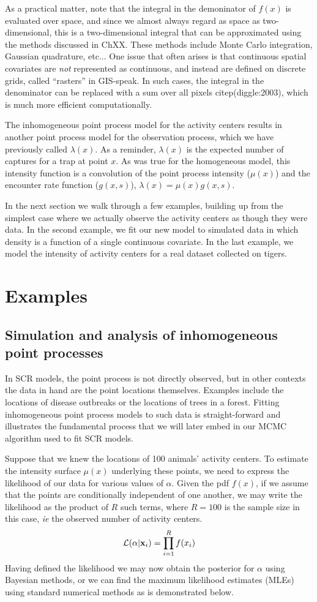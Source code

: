 \documentclass{book}
\begin{document}
As a practical matter, note that the integral in the
demoninator of $f(x)$ is evaluated over space, and since we almost always regard as
space as two-dimensional, this is a two-dimensional integral that can
be approximated using the methods discussed in ChXX. These methods include
Monte Carlo integration, Gaussian quadrature, etc... One
issue that often arises is that continuous spatial covariates are
\emph{not} represented as continuous, and instead are
defined on discrete grids, called ``rasters'' in GIS-speak. In such
cases, the integral in the denominator can be replaced with a sum over
all pixels citep(diggle:2003), which is much more efficient
computationally.

The inhomogeneous point process model for the activity centers results
in another point process model for the
observation process, which we have previously called $\lambda(x)$. As
a reminder, $\lambda(x)$ is the expected number of captures for a trap
at point $x$. As was true for the homogeneous model, this
intensity function is a convolution of the point process intensity
($\mu(x)$) and the encounter rate function ($g(x,s)$),
$\lambda(x) = \mu(x) g(x,s)$.

In the next section we walk through a few examples, building up from
the simplest case where we actually observe the activity centers as
though they were data. In the second example, we fit our new model to simulated
data in which density is a function of a single continuous
covariate. In the last example, we model the intensity of activity
centers for a real dataset collected on tigers.

\section{Examples}

\subsection{Simulation and analysis of inhomogeneous point processes}

In SCR models, the point process is not directly observed, but in
other contexts the data in hand are the point locations
themselves. Examples include the locations of disease
outbreaks or the locations of trees in a forest. Fitting inhomogeneous
point process models to such data is straight-forward and illustrates
the fundamental process that we will later embed in our MCMC algorithm
used to fit SCR models.

Suppose that we knew the locations of 100 animals' activity
centers. To estimate the intensity surface $\mu(x)$ underlying these points, we
need to express the likelihood of our data for various values of
$\alpha$. Given the pdf $f(x)$, if we assume that the points are
conditionally independent of one another, we may write
the likelihood as the product
of $R$ such terms, where $R=100$ is the sample size in this case,
\emph{ie} the observed number of activity centers.
\[
\mathcal{L}({\bf \alpha} | {\bf x}_i) = \prod_{i=1}^R f(x_i)
\]
Having defined the likelihood we may now obtain the posterior for
$\alpha$ using Bayesian methods, or we can find the maximum likelihood
estimates (MLEs) using standard numerical methods as is demonstrated
below.
\end{document}
